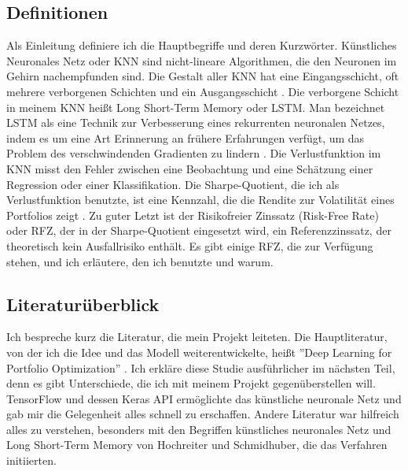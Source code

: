 \documentclass[12pt]{article}
\begin{document}
        \subsection{Definitionen}

            Als Einleitung definiere ich die Hauptbegriffe und deren Kurzwörter. 
            Künstliches Neuronales Netz oder KNN sind nicht-lineare Algorithmen, 
            die den Neuronen im Gehirn nachempfunden sind. 
            Die Gestalt aller KNN hat eine Eingangsschicht, 
            oft mehrere verborgenen Schichten und ein Ausgangsschicht \cite{bishop1995}. 
            Die verborgene Schicht in meinem KNN heißt Long Short-Term Memory oder
            LSTM. Man bezeichnet LSTM als eine Technik zur Verbesserung eines rekurrenten neuronalen Netzes,
            indem es um eine Art Erinnerung an frühere Erfahrungen verfügt, 
            um das Problem des verschwindenden Gradienten zu lindern \cite{hochreiter1997}. 
            Die Verlustfunktion im KNN misst den Fehler zwischen eine Beobachtung und eine Schätzung einer Regression oder einer Klassifikation. 
            Die Sharpe-Quotient, die ich als Verlustfunktion benutzte, 
            ist eine Kennzahl, die die Rendite zur Volatilität eines Portfolios zeigt \cite{sharpe1994}. 
            Zu guter Letzt ist der Risikofreier Zinssatz (Risk-Free Rate) oder RFZ,
            der in der Sharpe-Quotient eingesetzt wird, ein Referenzzinssatz, 
            der theoretisch kein Ausfallrisiko enthält. Es gibt einige RFZ, die zur Verfügung stehen,
            und ich erläutere, den ich benutzte und warum.
        
        \subsection{Literaturüberblick}
        
            Ich bespreche kurz die Literatur, die mein Projekt leiteten. 
            Die Hauptliteratur, von der ich die Idee und das Modell weiterentwickelte, 
            heißt ''Deep Learning for Portfolio Optimization'' \cite{zhang2020}. 
            Ich erkläre diese Studie ausführlicher im nächsten Teil, denn es gibt Unterschiede, 
            die ich mit meinem Projekt gegenüberstellen will. TensorFlow \cite{tensorflow2016} und 
            dessen Keras API \cite{chollet2015} ermöglichte das künstliche neuronale Netz und gab mir die Gelegenheit alles schnell zu erschaffen. 
            Andere Literatur war hilfreich alles zu verstehen, besonders mit den Begriffen künstliches neuronales Netz \cite{bishop1995}
            und Long Short-Term Memory von Hochreiter und Schmidhuber, die das Verfahren initiierten.
\end{document}

